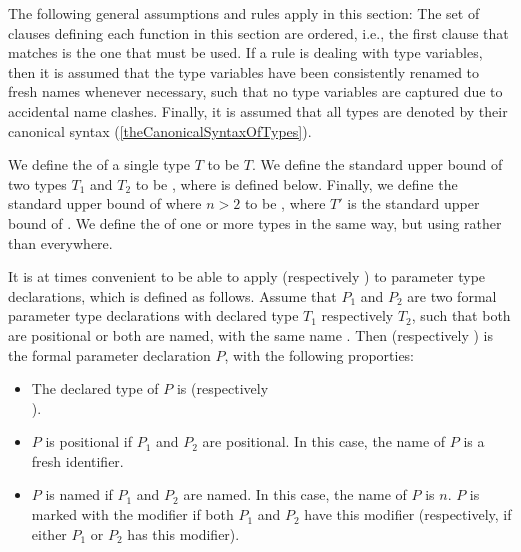 \documentclass[makeidx]{article}
\begin{document}
\LMHash{}%
The following general assumptions and rules apply in this section:
The set of clauses defining each function in this section are ordered,
i.e., the first clause that matches is the one that must be used.
If a rule is dealing with type variables,
then it is assumed that the type variables have been
consistently renamed to fresh names whenever necessary,
such that no type variables are captured due to accidental name clashes.
Finally, it is assumed that all types are denoted by their canonical syntax
(\ref{theCanonicalSyntaxOfTypes}).


\LMHash{}%
We define the
of a single type $T$ to be $T$.
We define the standard upper bound of two types $T_1$ and $T_2$ to be
, where \UpperBoundTypeName{} is defined below.
Finally, we define the standard upper bound
of  where $n > 2$
to be ,
where $T'$ is the standard upper bound of .
We define the
of one or more types in the same way,
but using \LowerBoundTypeName{} rather than \UpperBoundTypeName{} everywhere.

\LMHash{}%
It is at times convenient to be able to apply
\UpperBoundTypeName{} (respectively \LowerBoundTypeName)
to parameter type declarations,
which is defined as follows.
Assume that $P_1$ and $P_2$ are two formal parameter type declarations
with declared type $T_1$ respectively $T_2$,
such that both are positional or both are named,
with the same name .
Then  (respectively )
is the formal parameter declaration $P$,
with the following proporties:

\begin{itemize}
\item
  The declared type of $P$ is 
  (respectively\\
  ).
\item
  $P$ is positional if $P_1$ and $P_2$ are positional.
  In this case, the name of $P$ is a fresh identifier.
\item
  $P$ is named if $P_1$ and $P_2$ are named.
  In this case, the name of $P$ is $n$.
  $P$ is marked with the modifier \REQUIRED{}
  if both $P_1$ and $P_2$ have this modifier
  (respectively, if either $P_1$ or $P_2$ has this modifier).
\end{itemize}
\end{document}
